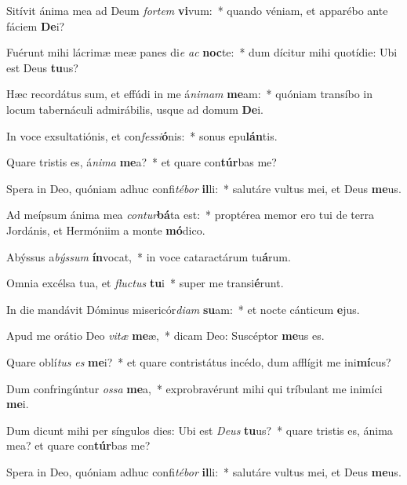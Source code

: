\item Sitívit ánima mea ad Deum \textit{for}\textit{tem} \textbf{vi}vum:~* quando véniam, et apparébo ante fáciem \textbf{De}i?
\item Fuérunt mihi lácrimæ meæ panes di\textit{e} \textit{ac} \textbf{noc}te:~* dum dícitur mihi quotídie: Ubi est Deus \textbf{tu}us?
\item Hæc recordátus sum, et effúdi in me á\textit{ni}\textit{mam} \textbf{me}am:~* quóniam transíbo in locum tabernáculi admirábilis, usque ad domum \textbf{De}i.
\item In voce exsultatiónis, et con\textit{fes}\textit{si}\textbf{ó}nis:~* sonus epu\textbf{lán}tis.
\item Quare tristis es, á\textit{ni}\textit{ma} \textbf{me}a?~* et quare con\textbf{túr}bas me?
\item Spera in Deo, quóniam adhuc confi\textit{té}\textit{bor} \textbf{il}li:~* salutáre vultus mei, et Deus \textbf{me}us.
\item Ad meípsum ánima mea \textit{con}\textit{tur}\textbf{bá}ta est:~* proptérea memor ero tui de terra Jordánis, et Hermóniim a monte \textbf{mó}dico.
\item Abýssus a\textit{býs}\textit{sum} \textbf{ín}vocat,~* in voce cataractárum tu\textbf{á}rum.
\item Omnia excélsa tua, et \textit{fluc}\textit{tus} \textbf{tu}i~* super me transi\textbf{é}runt.
\item In die mandávit Dóminus misericór\textit{di}\textit{am} \textbf{su}am:~* et nocte cánticum \textbf{e}jus.
\item Apud me orátio Deo \textit{vi}\textit{tæ} \textbf{me}æ,~* dicam Deo: Suscéptor \textbf{me}us es.
\item Quare oblí\textit{tus} \textit{es} \textbf{me}i?~* et quare contristátus incédo, dum afflígit me ini\textbf{mí}cus?
\item Dum confringúntur \textit{os}\textit{sa} \textbf{me}a,~* exprobravérunt mihi qui tríbulant me inimíci \textbf{me}i.
\item Dum dicunt mihi per síngulos dies: Ubi est \textit{De}\textit{us} \textbf{tu}us?~* quare tristis es, ánima mea? et quare con\textbf{túr}bas me?
\item Spera in Deo, quóniam adhuc confi\textit{té}\textit{bor} \textbf{il}li:~* salutáre vultus mei, et Deus \textbf{me}us.
